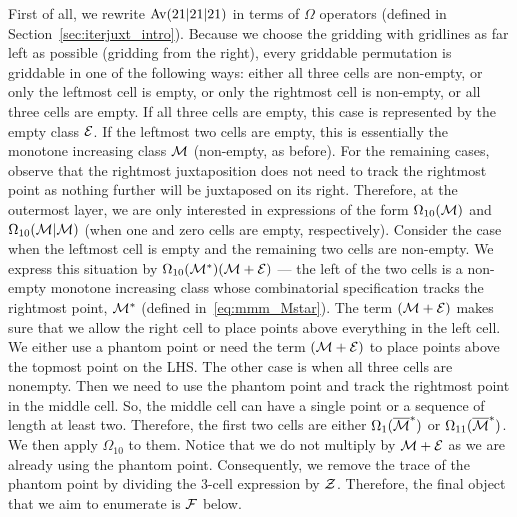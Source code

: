 \documentclass[12pt, a4paper, twoside]{report}
\begin{document}
First of all, we rewrite $\mathrm{Av}(21|21|21)$ in terms of $\Omega$ operators (defined in Section~\ref{sec:iterjuxt_intro}). Because we choose the gridding with gridlines as far left as possible (gridding from the right), every griddable permutation is griddable in one of the following ways: either all three cells are non-empty, or only the leftmost cell is empty, or only the rightmost cell is non-empty, or all three cells are empty. If all three cells are empty, this case is represented by the empty class $\mathcal{E}$. If the leftmost two cells are empty, this is essentially the monotone increasing class $\mathcal{M}$ (non-empty, as before). For the remaining cases, observe that the rightmost juxtaposition does not need to track the rightmost point as nothing further will be juxtaposed on its right. Therefore, at the outermost layer, we are only interested in expressions of the form $\Omega_{10}(\mathcal{M})$ and $\Omega_{10}(\mathcal{M}|\mathcal{M})$  (when one and zero cells are empty, respectively). Consider the case when the leftmost cell is empty and the remaining two cells are non-empty. We express this situation by $\Omega_{10}(\mathcal{M}^*)(\mathcal{M}+\mathcal{E})$ --- the left of the two cells is a non-empty monotone increasing class whose combinatorial specification tracks the rightmost point, $\mathcal{M}^*$ (defined in~\eqref{eq:mmm_Mstar}). The term $(\mathcal{M}+\mathcal{E})$ makes sure that we allow the right cell to place points above everything in the left cell. We either use a phantom point or need the term $(\mathcal{M}+\mathcal{E})$ to place points above the topmost point on the LHS. The other case is when all three cells are nonempty. Then we need to use the phantom point and track the rightmost point in the middle cell. So, the middle cell can have a single point or a sequence of length at least two. Therefore, the first two cells are either $\Omega_1(\overline{\mathcal{M}}^*)$ or $\Omega_{11}(\overline{\mathcal{M}}^*)$. We then apply $\Omega_{10}$ to them. Notice that we do not multiply by $\mathcal{M}+\mathcal{E}$ as we are already using the phantom point. Consequently, we remove the trace of the phantom point by dividing the 3-cell expression by $\mathcal{Z}$. Therefore, the final object that we aim to enumerate is $\mathcal{F}$ below.
\end{document}
